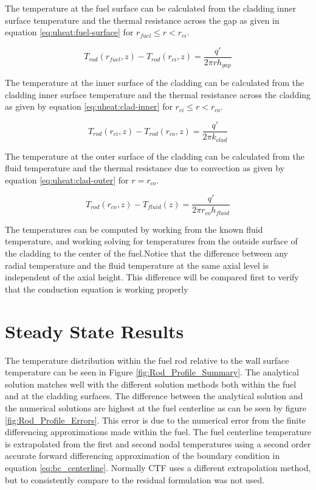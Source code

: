 The temperature at the fuel surface can be calculated from the cladding inner
surface temperature and the thermal resistance across the gap as given in equation
\ref{eq:uheat:fuel-surface} for $r_{fuel} \leq r < r_{ci}$.

\begin{equation}
	\label{eq:uheat:fuel-surface}
	T_{rod}(r_{fuel},z)-T_{rod}(r_{ci},z)
	=\frac{q'}{2 \pi r h_{gap}}
\end{equation}

The temperature at the inner surface of the cladding can be calculated from the
cladding inner surface temperature and the thermal resistance across the 
cladding as given by equation \ref{eq:uheat:clad-inner} for $r_{ci} \leq r
< r_{co}$.

\begin{equation}
	\label{eq:uheat:clad-inner}
	T_{rod}(r_{ci},z)-T_{rod}(r_{co},z)
	=\frac{q'}{2 \pi k_{clad}}
\end{equation}

The temperature at the outer surface of the cladding can be calculated from the
fluid temperature and the thermal resistance due to convection as given by
equation \ref{eq:uheat:clad-outer} for $ r = r_{co}$.

\begin{equation}
	\label{eq:uheat:clad-outer}
	T_{rod}(r_{co},z)-T_{fluid}(z)
	=\frac{q'}{2 \pi r_{co} h_{fluid}}
\end{equation}

The temperatures can be computed by working from the known fluid temperature,
and  working solving for temperatures from the outside surface of the cladding
to the  center of the fuel.Notice that the difference between any radial
temperature  and the fluid temperature at the same axial level is independent of
the axial height.  This difference will be compared first to verify that the
conduction equation is working properly

\section{Steady State Results}

The temperature distribution within the fuel rod relative to the wall surface
temperature can be seen in Figure \ref{fig:Rod_Profile_Summary}. The analytical
solution matches well with the  different solution methods both within the fuel
and at the cladding surfaces.  The difference between the analytical solution
and the numerical solutions are  highest at the fuel centerline as can be seen
by figure \ref{fig:Rod_Profile_Errors}. This error is due to the numerical
error from  the finite differencing approximations made within the fuel. The
fuel centerline  temperature  is extrapolated from the first and second nodal
temperatures  using a second order accurate forward differencing approximation
of the  boundary condition in equation \ref{eq:bc_centerline}. Normally CTF 
uses a different extrapolation method, but to consistently compare  to the
residual formulation was not used.

